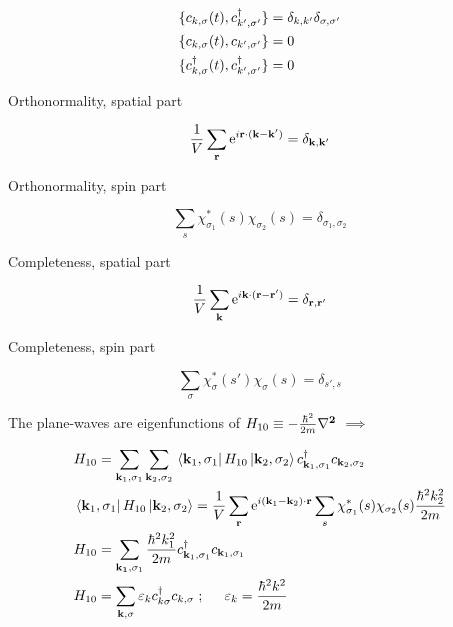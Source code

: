 \begin{align}
	&\{c_{k,\sigma}(t), c^{\dagger}_{ k', \sigma'} \}= \delta_{k,k'}\delta_{\sigma,\sigma'}\\
	&\{c_{k,\sigma}(t), c_{ k', \sigma'} \}= 0\\
	&\{c^{\dagger}_{k,\sigma}(t), c^{\dagger}_{ k', \sigma'} \}= 0
\end{align}

\noindent Orthonormality, spatial part

\begin{equation}
	\frac{1}{V} \sum_{\vb{r}} \mathrm{e}^{i \vb{r}\cdot (\vb{k}-\vb{k}')} = \delta_{\vb{k}, \vb{k}'}
\end{equation}

\noindent Orthonormality, spin part

\begin{equation}
	\sum_s \chi_{\sigma_1}^* (s) \chi_{\sigma_2} (s) = \delta_{\sigma_1,\sigma_2}
\end{equation}

\noindent Completeness, spatial part

\begin{equation}
\frac{1}{V} \sum_{\vb{k}} \mathrm{e}^{i \vb{k}\cdot (\vb{r}-\vb{r}')} = \delta_{\vb{r}, \vb{r}'}
\end{equation}

\noindent Completeness, spin part

\begin{equation}
\sum_{\sigma} \chi_{\sigma}^* (s') \chi_{\sigma} (s) = \delta_{s',s}
\end{equation}

\noindent The plane-waves are eigenfunctions of $H_{10} \equiv -\frac{\hbar^2}{2m} \vb{\laplacian}$ $\implies$

\begin{align}
	& H_{10} = \sum_{\vb{k}_1, \sigma_1} \sum_{\vb{k}_2, \sigma_2} \bra*{\vb{k}_1, \sigma_1} H_{10} \ket*{\vb{k}_2, \sigma_2} c^{\dagger}_{ \vb{k}_1, \sigma_1} c_{\vb{k}_2, \sigma_2}\\
	&  \bra*{\vb{k}_1, \sigma_1} H_{10} \ket*{\vb{k}_2, \sigma_2}  = \frac{1}{V} \sum_{\vb{r}} \mathrm{e}^{i (\vb{k}_1-\vb{k}_2)\cdot \vb{r}}  \sum_s \chi_{\sigma_1}^*(s) \chi_{\sigma_2}(s) \frac{\hbar^2 k_2^2}{2m}\\
	& H_{10}= \sum_{\vb{k_1}, \sigma_1} \frac{\hbar^2 k_1^2}{2m} c^{\dagger}_{ \vb{k}_1, \sigma_1} c_{ \vb{k}_1, \sigma_1} \nonumber\\ 
	& H_{10}= \sum_{\vb{k}, \sigma} \varepsilon_k c^{\dagger}_{k \sigma} c_{ k, \sigma} \hspace{0.1cm} ; \hspace{0.5cm} \varepsilon_k = \frac{\hbar^2 k^2}{2m} \nonumber
\end{align}

